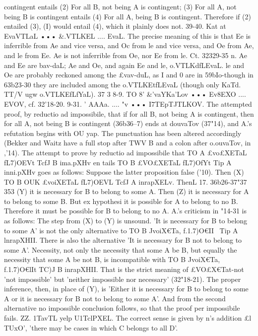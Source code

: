 {{{{{{{{contingent entails (2) For all B, not being A is contingent; (3)
For all A, not being B is contingent entails (4) For all A, being B
is contingent. Therefore if (2) entailed (3), (I) would entail (4),
which it plainly does not.
39-40. Kat at EvaVTLaL ••• &.VTLKEL .... EvaL. The precise meaning
of this is that Ee is inferrible from Ae and vice versa, and Oc
from le and vice versa, and Oe from Ae, and le from Ee. Ae is
not inferrible from Oe, nor Ee from le. Ct. 32329-35 n. Ae and
Ee are bav-daL; Ae and Oe, and again Ee and le, o.VTLKdfLEvaL.
le and Oe are probably reckoned among the £vav-duL, as I and 0
are in 59bIo-though in 63b23-30 they are included among the
o.VTLKEtfLEvaL (though only KaTd. TT/V ugw o.VTLKE{fLfYaL).
37 3 8-9. TO 8' &'vaYKa'Lov ••• Ev8EXO .... EVOV, cf. 32'18-20.
9-31. ' AAAa. .... "v ••• I7TEpTJTLKOV. The attempted proof, by
reductio ad impossibile, that if for all B, not being A is contingent,
then for all A, not being B is contingent (36b36--7) ends at
douvaTov (37"14), and A.'s refutation begins with OU yap. The
punctuation has been altered accordingly (Bekker and Waitz
have a full stop after TWV B and a colon after o.ouvaTov, in ,'14).
The attempt to prove by reductio ad impossibile that TO A
£vo£XETaL fL7)OEVt TcfJ B ima.pXHv en tails TO B £VO£XETaL fL7)OfYt Tip A
inni.pXHv goes as follows: Suppose the latter proposition false
('10). Then (X) TO B OUK £voiXETaL fL7)OEVL TcfJ A inrapXELv. ThenL 17. 36b26-37"37
353
(Y) it is necessary for B to belong to some A. Then (Z) it is
necessary for A to belong to some B. But ex hypothesi it is
possible for A to belong to no B. Therefore it must be possible
for B to belong to no A.
A.'s criticism in "14-31 is as follows: The step from (X) to (Y)
is unsound. 'It is necessary for B to belong to some A' is not
the only alternative to TO B JvoiX€Ta, f.1.7)O€II~ Tip A lnrapXHII. There
is also the alternative 'It is necessary for B not to belong to some
A'. Necessity, not only the necessity that some A be B, but
equally the necessity that some A be not B, is incompatible with
TO B JvoiX€Ta, f.1.7)O€lIt TC)J B inrapXHII. That is the strict meaning
of £VO£X€Tat-not 'not impossible' but 'neither impossible nor
necessary' (32"18-21). The proper inference, then, in place of
(Y), is 'Either it is necessary for B to belong to some A or it is
necessary for B not to belong to some A'. And from the second
alternative no impossible conclusion follows, so that the proof per
impossibile fails.
ZZ. 1TavTL yelp U1TclPXEL. The correct sense is given by n's
addition £l TUxO', 'there may be cases in which C belongs to all D'.
}}}}}}}}}
